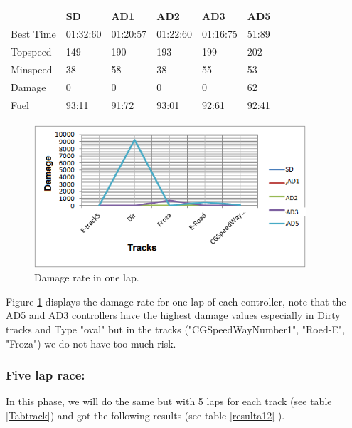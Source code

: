 \documentclass{llncs}
\begin{document}
\begin{table} [h!]
	\begin{tabular}{ |p{3cm}|p{2cm}|p{2cm}|p{2 cm}|p{2 cm}|p{2 cm}|}
		\hline
		&
		{ \color{red}\textbf{SD}}&  
		{ \color{red} \textbf{AD1} } &
		{ \color{red} \textbf{AD2} } &
		{ \color{red} \textbf{AD3} } &
		{ \color{red} \textbf{AD5} }
		\\
		\hline
		Best Time & 01:32:60   & 01:20:57 & 01:22:60 & 01:16:75 & 51:89 
		\\
		\hline
		Topspeed & 149  & 190 & 193 & 199 & 202
		\\
		\hline
		Minspeed & 38 & 58 & 38 & 55  & 53
		\\
		\hline 
		Damage & 0 & 0 & 0& 0 & 62
		\\
		\hline 
		Fuel & 93:11  & 91:72 & 93:01 & 92:61 & 92:41
		\\
		\hline 
		
	\end{tabular} 
\end{table}
\newpage

\begin{figure}[h!]
	
	\centering
	\includegraphics[width=0.9\textwidth]{fig/choc1lap.png}
	\begin{minipage}{10cm}
		\centering
		\caption{\footnotesize Damage rate in one lap.}
		\label{choclap}
	\end{minipage} 
\end{figure}


Figure \ref{choclap} displays the damage rate for one lap of each controller, note that the AD5 and AD3 controllers  have the highest damage values especially in Dirty tracks and Type "oval" but in the tracks ("CGSpeedWayNumber1", "Roed-E", "Froza") we do not have too much risk.

\newpage


\subsubsection{ Five lap race:}	
In this phase, we will do the same but with 5 laps for each track (see table \ref {Tabtrack}) and got the following results (see table \ref{resulta12} ). \\
\end{document}
